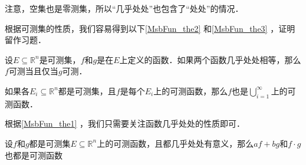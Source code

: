 注意，空集也是零测集，所以“几乎处处”也包含了“处处”的情况．

根据可测集的性质，我们容易得到以下\autoref{MsbFun_the2} 和\autoref{MsbFun_the3} ，证明留作习题．

\begin{theorem}{}\label{MsbFun_the2}
设$E\subseteq\mathbb{R}^n$是可测集，$f$和$g$是在$E$上定义的函数．如果两个函数几乎处处相等，那么$f$可测当且仅当$g$可测．
\end{theorem}



\begin{theorem}{}\label{MsbFun_the3}
如果各$E_i\subseteq\mathbb{R}^n$都是可测集，且$f$是每个$E_i$上的可测函数，那么$f$也是$\bigcup_{i=1}^\infty$上的可测函数．
\end{theorem}

根据\autoref{MsbFun_the1} ，我们只需要关注函数几乎处处的性质即可．

\begin{theorem}{}
设$f$和$g$都是可测集$E\subseteq\mathbb{R}^n$上的可测函数，且都几乎处处有意义，那么$af+bg$和$f\cdot g$也都是可测函数
\end{theorem}





